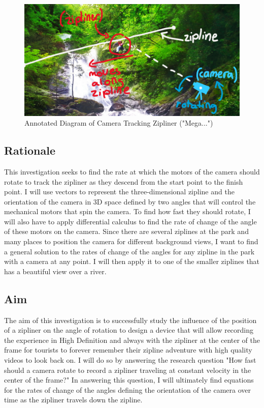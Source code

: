 \documentclass[12pt]{article}
\begin{document}
\begin{figure}[H]
\centering
\includegraphics[width=500pt]{img/annotation.png}
\caption{\label{fig:1}Annotated Diagram of Camera Tracking Zipliner ("Mega...")}
\end{figure}

\subsection{Rationale}
This investigation seeks to find the rate at which the motors of the camera should rotate to track the zipliner as they descend from the start point to the finish point. I will use vectors to represent the three-dimensional zipline and the orientation of the camera in 3D space defined by two angles that will control the mechanical motors that spin the camera. To find how fast they should rotate, I will also have to apply differential calculus to find the rate of change of the angle of these motors on the camera. Since there are several ziplines at the park and many places to position the camera for different background views, I want to find a general solution to the rates of change of the angles for any zipline in the park with a camera at any point. I will then apply it to one of the smaller ziplines that has a beautiful view over a river. 

\subsection{Aim}
The aim of this investigation is to successfully study the influence of the position of a zipliner on the angle of rotation to design a device that will allow recording the experience in High Definition and always with the zipliner at the center of the frame for tourists to forever remember their zipline adventure with high quality videos to look back on. I will do so by answering the research question "How fast should a camera rotate to record a zipliner traveling at constant velocity in the center of the frame?" In answering this question, I will ultimately find equations for the rates of change of the angles defining the orientation of the camera over time as the zipliner travels down the zipline. 
\end{document}
